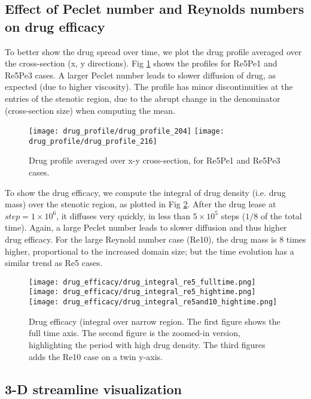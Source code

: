\subsection{Effect of Peclet number and Reynolds numbers on drug efficacy}

To better show the drug spread over time, we plot the drug profile averaged over the cross-section (x, y directions). Fig \ref{fig:drug_profile} shows the profiles for Re5Pe1 and Re5Pe3 cases. A larger Peclet number leads to slower diffusion of drug, as expected (due to higher viscosity). The profile has minor discontinuities at the entries of the stenotic region, due to the abrupt change in the denominator (cross-section size) when computing the mean.

\begin{figure}[H]\ContinuedFloat
\texttt{[image: drug\_profile/drug\_profile\_204]}
\texttt{[image: drug\_profile/drug\_profile\_216]}
\centering
\caption{Drug profile averaged over x-y cross-section, for Re5Pe1 and Re5Pe3 cases.}
\label{fig:drug_profile}
\end{figure}

To show the drug efficacy, we compute the integral of drug density (i.e. drug mass) over the stenotic region, as plotted in Fig \ref{fig:drug_efficacy}. After the drug lease at $step = 1 \times 10^6$, it diffuses very quickly, in less than $5 \times 10^5$ steps ($1/8$ of the total time). Again, a large Peclet number leads to slower diffusion and thus higher drug efficacy. For the large Reynold number case (Re10), the drug mass is 8 times higher, proportional to the increased domain size; but the time evolution has a similar trend as Re5 cases.

\begin{figure}[H]
\texttt{[image: drug\_efficacy/drug\_integral\_re5\_fulltime.png]}
\texttt{[image: drug\_efficacy/drug\_integral\_re5\_hightime.png]}
\texttt{[image: drug\_efficacy/drug\_integral\_re5and10\_hightime.png]}
\centering
\caption{Drug efficacy (integral over narrow region. The first figure shows the full time axis. The second figure is the zoomed-in version, highlighting the period with high drug density. The third figures adds the Re10 case on a twin y-axis.}
\label{fig:drug_efficacy}
\end{figure}

\subsection{3-D streamline visualization}

